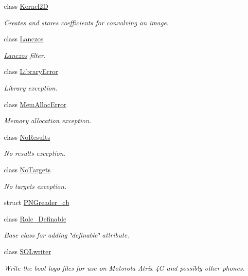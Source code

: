 \begin{DoxyCompactItemize}
class \hyperlink{class_photo_finish_1_1_kernel2_d}{Kernel2D}
\begin{DoxyCompactList}\small\item\em Creates and stores coefficients for convolving an image. \end{DoxyCompactList}\item 
class \hyperlink{class_photo_finish_1_1_lanczos}{Lanczos}
\begin{DoxyCompactList}\small\item\em \hyperlink{class_photo_finish_1_1_lanczos}{Lanczos} filter. \end{DoxyCompactList}\item 
class \hyperlink{class_photo_finish_1_1_library_error}{Library\+Error}
\begin{DoxyCompactList}\small\item\em Library exception. \end{DoxyCompactList}\item 
class \hyperlink{class_photo_finish_1_1_mem_alloc_error}{Mem\+Alloc\+Error}
\begin{DoxyCompactList}\small\item\em Memory allocation exception. \end{DoxyCompactList}\item 
class \hyperlink{class_photo_finish_1_1_no_results}{No\+Results}
\begin{DoxyCompactList}\small\item\em No results exception. \end{DoxyCompactList}\item 
class \hyperlink{class_photo_finish_1_1_no_targets}{No\+Targets}
\begin{DoxyCompactList}\small\item\em No targets exception. \end{DoxyCompactList}\item 
struct \hyperlink{struct_photo_finish_1_1_p_n_greader__cb}{P\+N\+Greader\+\_\+cb}
\item 
class \hyperlink{class_photo_finish_1_1_role___definable}{Role\+\_\+\+Definable}
\begin{DoxyCompactList}\small\item\em Base class for adding \char`\"{}definable\char`\"{} attribute. \end{DoxyCompactList}\item 
class \hyperlink{class_photo_finish_1_1_s_o_lwriter}{S\+O\+Lwriter}
\begin{DoxyCompactList}\small\item\em Write the boot logo files for use on Motorola Atrix 4G and possibly other phones. \end{DoxyCompactList}\item 

\end{DoxyCompactItemize}

